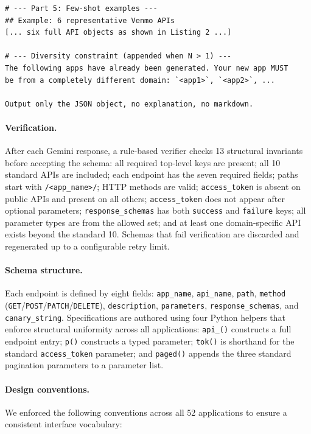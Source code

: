 \documentclass[11pt]{article}
\begin{document}
\begin{lstlisting}
# --- Part 5: Few-shot examples ---
## Example: 6 representative Venmo APIs
[... six full API objects as shown in Listing 2 ...]

# --- Diversity constraint (appended when N > 1) ---
The following apps have already been generated. Your new app MUST
be from a completely different domain: `<app1>`, `<app2>`, ...

Output only the JSON object, no explanation, no markdown.
\end{lstlisting}

\paragraph{Verification.}
After each Gemini response, a rule-based verifier checks 13 structural invariants before accepting the schema: all required top-level keys are present; all 10 standard APIs are included; each endpoint has the seven required fields; paths start with \texttt{/<app\_name>/}; HTTP methods are valid; \texttt{access\_token} is absent on public APIs and present on all others; \texttt{access\_token} does not appear after optional parameters; \texttt{response\_schemas} has both \texttt{success} and \texttt{failure} keys; all parameter types are from the allowed set; and at least one domain-specific API exists beyond the standard 10. Schemas that fail verification are discarded and regenerated up to a configurable retry limit.

\paragraph{Schema structure.}
Each endpoint is defined by eight fields: \texttt{app\_name}, \texttt{api\_name}, \texttt{path}, \texttt{method} (\texttt{GET}/\texttt{POST}/\texttt{PATCH}/\texttt{DELETE}), \texttt{description}, \texttt{parameters}, \texttt{response\_schemas}, and \texttt{canary\_string}. Specifications are authored using four Python helpers that enforce structural uniformity across all applications: \texttt{api\_()} constructs a full endpoint entry; \texttt{p()} constructs a typed parameter; \texttt{tok()} is shorthand for the standard \texttt{access\_token} parameter; and \texttt{paged()} appends the three standard pagination parameters to a parameter list.

\paragraph{Design conventions.}
We enforced the following conventions across all 52 applications to ensure a consistent interface vocabulary:
\end{document}
